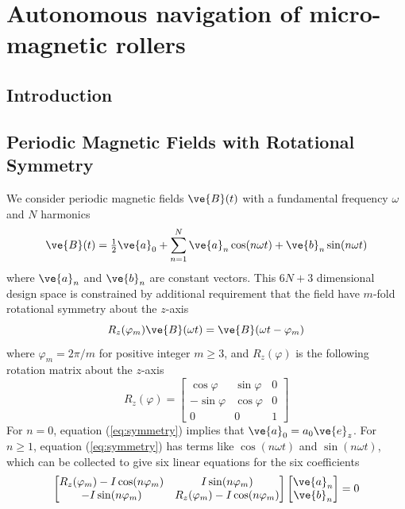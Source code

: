 \chapter{Autonomous navigation of micro-magnetic rollers} 
\section{Introduction}




\section{Periodic Magnetic Fields with Rotational Symmetry}

We consider periodic magnetic fields $\ve{B}(t)$ with a fundamental frequency $\omega$ and $N$ harmonics
\begin{equation}
    \ve{B}(t) = \tfrac{1}{2} \ve{a}_0 + \sum_{n=1}^N \ve{a}_n \cos(n\omega t) + \ve{b}_n \sin(n\omega t)
\end{equation}
where $\ve{a}_n$ and $\ve{b}_n$ are constant vectors. This $6N+3$ dimensional design space is constrained by additional requirement that the field have $m$-fold rotational symmetry about the $z$-axis
\begin{equation}
    R_z(\varphi_m) \ve{B}(\omega t) = \ve{B}(\omega t - \varphi_m) \label{eq:symmetry}
\end{equation}
where $\varphi_m=2\pi/m$ for positive integer $m\geq 3$, and $R_z(\varphi)$ is the following rotation matrix about the $z$-axis
\begin{equation}
    R_z(\varphi) = \begin{bmatrix} 
    \cos \varphi & \sin \varphi & 0 \\
    -\sin \varphi & \cos \varphi & 0 \\
    0 & 0 & 1    
    \end{bmatrix}
\end{equation}
For $n=0$, equation (\ref{eq:symmetry}) implies that $\ve{a}_0 = a_0 \ve{e}_z$. For $n\geq1$, equation (\ref{eq:symmetry}) has terms like $\cos(n \omega t)$ and $\sin(n\omega t)$, which can be collected to give six linear equations for the six coefficients 
\begin{equation}
    \begin{bmatrix} 
    R_z(\varphi_m) - I \cos(n\varphi_m) & I \sin(n \varphi_m) \\
    -I \sin(n \varphi_m) & R_z(\varphi_m) - I \cos(n\varphi_m)
    \end{bmatrix} 
    \begin{bmatrix} \ve{a}_n \\ \ve{b}_n \end{bmatrix} = 0
\end{equation}
